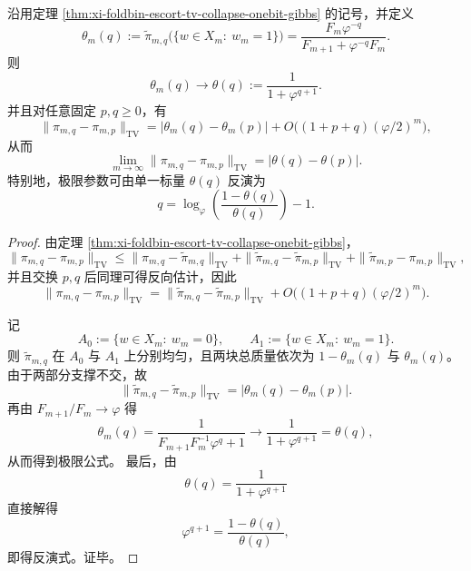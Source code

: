 \begin{theorem}\label{thm:xi-foldbin-escort-tv-identifiable-limit-distance}
沿用定理 \ref{thm:xi-foldbin-escort-tv-collapse-onebit-gibbs} 的记号，并定义
\[
\theta_m(q):=\widetilde\pi_{m,q}\bigl(\{w\in X_m:\ w_m=1\}\bigr)
=
\frac{F_m\varphi^{-q}}{F_{m+1}+\varphi^{-q}F_m}.
\]
则
\[
\theta_m(q)\longrightarrow \theta(q):=\frac{1}{1+\varphi^{q+1}}.
\]
并且对任意固定 \(p,q\ge 0\)，有
\[
\|\pi_{m,q}-\pi_{m,p}\|_{\mathrm{TV}}
=
|\theta_m(q)-\theta_m(p)|
+O\!\bigl((1+p+q)(\varphi/2)^m\bigr),
\]
从而
\[
\lim_{m\to\infty}\|\pi_{m,q}-\pi_{m,p}\|_{\mathrm{TV}}
=
|\theta(q)-\theta(p)|.
\]
特别地，极限参数可由单一标量 \(\theta(q)\) 反演为
\[
q=\log_\varphi\!\left(\frac{1-\theta(q)}{\theta(q)}\right)-1.
\]
\end{theorem}
\begin{proof}
由定理 \ref{thm:xi-foldbin-escort-tv-collapse-onebit-gibbs}，
\[
\|\pi_{m,q}-\pi_{m,p}\|_{\mathrm{TV}}
\le
\|\pi_{m,q}-\widetilde\pi_{m,q}\|_{\mathrm{TV}}
+\|\widetilde\pi_{m,q}-\widetilde\pi_{m,p}\|_{\mathrm{TV}}
+\|\widetilde\pi_{m,p}-\pi_{m,p}\|_{\mathrm{TV}},
\]
并且交换 \(p,q\) 后同理可得反向估计，因此
\[
\|\pi_{m,q}-\pi_{m,p}\|_{\mathrm{TV}}
=
\|\widetilde\pi_{m,q}-\widetilde\pi_{m,p}\|_{\mathrm{TV}}
+O\!\bigl((1+p+q)(\varphi/2)^m\bigr).
\]

记
\[
A_0:=\{w\in X_m:\ w_m=0\},
\qquad
A_1:=\{w\in X_m:\ w_m=1\}.
\]
则 \(\widetilde\pi_{m,q}\) 在 \(A_0\) 与 \(A_1\) 上分别均匀，且两块总质量依次为
\(
1-\theta_m(q)
\)
与
\(
\theta_m(q)
\)。
由于两部分支撑不交，故
\[
\|\widetilde\pi_{m,q}-\widetilde\pi_{m,p}\|_{\mathrm{TV}}
=
|\theta_m(q)-\theta_m(p)|.
\]
再由 \(F_{m+1}/F_m\to\varphi\) 得
\[
\theta_m(q)=\frac{1}{F_{m+1}F_m^{-1}\varphi^q+1}\longrightarrow \frac{1}{1+\varphi^{q+1}}=\theta(q),
\]
从而得到极限公式。
最后，由
\[
\theta(q)=\frac{1}{1+\varphi^{q+1}}
\]
直接解得
\[
\varphi^{q+1}=\frac{1-\theta(q)}{\theta(q)},
\]
即得反演式。证毕。
\end{proof}

